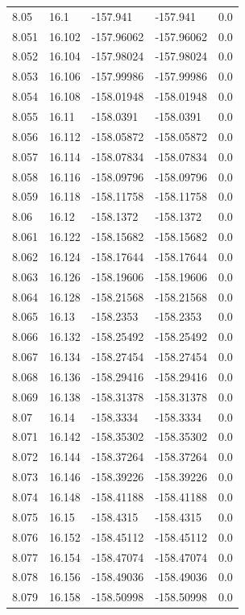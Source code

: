 \begin{tabular}{lllll}
8.05 & 16.1 & -157.941 & -157.941 & 0.0 \\
8.051 & 16.102 & -157.96062 & -157.96062 & 0.0 \\
8.052 & 16.104 & -157.98024 & -157.98024 & 0.0 \\
8.053 & 16.106 & -157.99986 & -157.99986 & 0.0 \\
8.054 & 16.108 & -158.01948 & -158.01948 & 0.0 \\
8.055 & 16.11 & -158.0391 & -158.0391 & 0.0 \\
8.056 & 16.112 & -158.05872 & -158.05872 & 0.0 \\
8.057 & 16.114 & -158.07834 & -158.07834 & 0.0 \\
8.058 & 16.116 & -158.09796 & -158.09796 & 0.0 \\
8.059 & 16.118 & -158.11758 & -158.11758 & 0.0 \\
8.06 & 16.12 & -158.1372 & -158.1372 & 0.0 \\
8.061 & 16.122 & -158.15682 & -158.15682 & 0.0 \\
8.062 & 16.124 & -158.17644 & -158.17644 & 0.0 \\
8.063 & 16.126 & -158.19606 & -158.19606 & 0.0 \\
8.064 & 16.128 & -158.21568 & -158.21568 & 0.0 \\
8.065 & 16.13 & -158.2353 & -158.2353 & 0.0 \\
8.066 & 16.132 & -158.25492 & -158.25492 & 0.0 \\
8.067 & 16.134 & -158.27454 & -158.27454 & 0.0 \\
8.068 & 16.136 & -158.29416 & -158.29416 & 0.0 \\
8.069 & 16.138 & -158.31378 & -158.31378 & 0.0 \\
8.07 & 16.14 & -158.3334 & -158.3334 & 0.0 \\
8.071 & 16.142 & -158.35302 & -158.35302 & 0.0 \\
8.072 & 16.144 & -158.37264 & -158.37264 & 0.0 \\
8.073 & 16.146 & -158.39226 & -158.39226 & 0.0 \\
8.074 & 16.148 & -158.41188 & -158.41188 & 0.0 \\
8.075 & 16.15 & -158.4315 & -158.4315 & 0.0 \\
8.076 & 16.152 & -158.45112 & -158.45112 & 0.0 \\
8.077 & 16.154 & -158.47074 & -158.47074 & 0.0 \\
8.078 & 16.156 & -158.49036 & -158.49036 & 0.0 \\
8.079 & 16.158 & -158.50998 & -158.50998 & 0.0 \\

\end{tabular}
